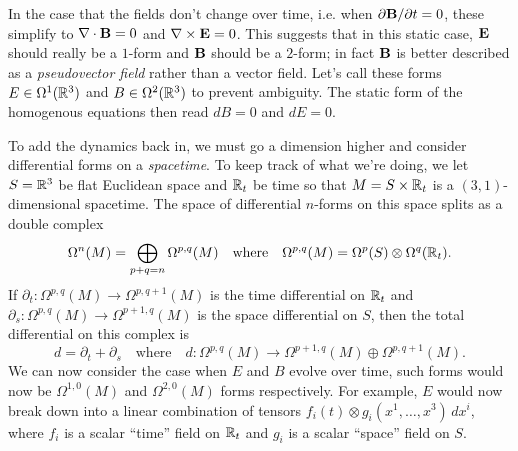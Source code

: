 \documentclass{article}
\begin{document}
In the case that the fields don't change over time, i.e. when $\partial \mathbf{B}/\partial t=0$, these simplify to $\nabla\cdot \mathbf{B} = 0$ and $\nabla\times \mathbf{E}=0$. This suggests that in this static case, $\mathbf{E}$ should really be a $1$-form and $\mathbf{B}$ should be a $2$-form; in fact $\mathbf{B}$ is better described as a \emph{pseudovector field} rather than a vector field. Let's call these forms $E\in \Omega^1(\mathbb{R}^3)$ and $B\in \Omega^2(\mathbb{R}^3)$ to prevent ambiguity. The static form of the homogenous equations then read $dB = 0$ and $dE = 0$.

To add the dynamics back in, we must go a dimension higher and consider differential forms on a \emph{spacetime}. To keep track of what we're doing, we let $S=\mathbb{R}^3$ be flat Euclidean space and $\mathbb{R}_t$ be time so that $M=S\times \mathbb{R}_t$ is a $(3,1)$-dimensional spacetime. The space of differential $n$-forms on this space splits as a double complex
\[
  \Omega^n(M) = \bigoplus_{p+q=n} \Omega^{p,q}(M)\quad\textrm{where}\quad \Omega^{p,q}(M) = \Omega^p(S)\otimes \Omega^q(\mathbb{R}_t).
\]
If $\partial_t : \Omega^{p,q}(M) \to \Omega^{p,q+1}(M)$ is the time differential on $\mathbb{R}_t$ and $\partial_s : \Omega^{p,q}(M) \to \Omega^{p+1,q}(M)$ is the space differential on $S$, then the total differential on this complex is \[d=\partial_t+\partial_s \quad\textrm{where}\quad d: \Omega^{p,q}(M) \to \Omega^{p+1,q}(M)\oplus \Omega^{p,q+1}(M).\] We can now consider the case when $E$ and $B$ evolve over time, such forms would now be $\Omega^{1,0}(M)$ and $\Omega^{2,0}(M)$ forms respectively. For example, $E$ would now break down into a linear combination of tensors $f_i(t)\otimes g_i(x^1,\ldots, x^3)\, dx^i$, where $f_i$ is a scalar ``time'' field on $\mathbb{R}_t$ and $g_i$ is a scalar ``space'' field on $S$.
\end{document}
